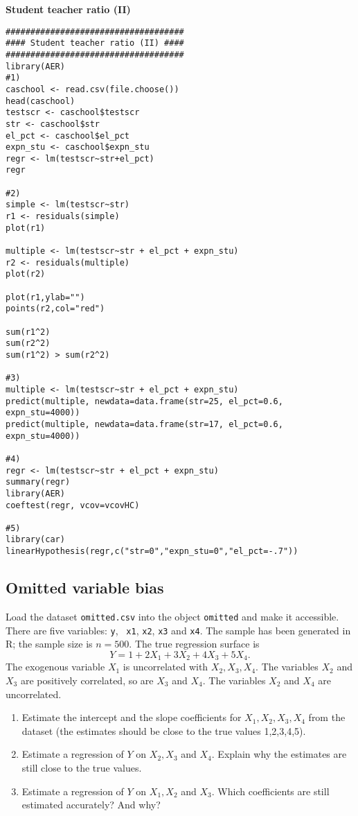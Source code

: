 \documentclass{article}
\begin{document}
\begin{solution}
\textbf{Student teacher ratio (II)}

\begin{verbatim}
####################################
#### Student teacher ratio (II) ####
####################################
library(AER)
#1)
caschool <- read.csv(file.choose())
head(caschool)
testscr <- caschool$testscr
str <- caschool$str
el_pct <- caschool$el_pct
expn_stu <- caschool$expn_stu
regr <- lm(testscr~str+el_pct)
regr

#2)
simple <- lm(testscr~str)
r1 <- residuals(simple)
plot(r1)

multiple <- lm(testscr~str + el_pct + expn_stu)
r2 <- residuals(multiple)
plot(r2)

plot(r1,ylab="")
points(r2,col="red")

sum(r1^2)
sum(r2^2)
sum(r1^2) > sum(r2^2)

#3)
multiple <- lm(testscr~str + el_pct + expn_stu)
predict(multiple, newdata=data.frame(str=25, el_pct=0.6, expn_stu=4000))
predict(multiple, newdata=data.frame(str=17, el_pct=0.6, expn_stu=4000))

#4)
regr <- lm(testscr~str + el_pct + expn_stu)
summary(regr)
library(AER)
coeftest(regr, vcov=vcovHC)

#5)
library(car)
linearHypothesis(regr,c("str=0","expn_stu=0","el_pct=-.7"))
\end{verbatim}
\end{solution}

\subsection{Omitted variable bias\label{omitted}}

Load the dataset \texttt{omitted.csv} into the object \texttt{omitted} and make it
accessible. There are five variables: \texttt{y}, \texttt{%
x1}, \texttt{x2}, \texttt{x3} and \texttt{x4}. The sample has been generated
in R; the sample size is $n=500$. The true regression surface is%
\begin{equation*}
Y=1+2X_{1}+3X_{2}+4X_{3}+5X_{4}.
\end{equation*}%
The exogenous variable $X_{1}$ is uncorrelated with $X_{2},X_{3},X_{4}$. The
variables $X_{2}$ and $X_{3}$ are positively correlated, so are $X_{3}$ and $%
X_{4}$. The variables $X_{2}$ and $X_{4}$ are uncorrelated.

\begin{enumerate}
\item Estimate the intercept and the slope coefficients for $%
X_{1},X_{2},X_{3},X_{4}$ from the dataset (the estimates should be close to
the true values 1,2,3,4,5).

\item Estimate a regression of $Y$ on $X_{2},X_{3}$ and $X_{4}$. Explain why
the estimates are still close to the true values.

\item Estimate a regression of $Y$ on $X_{1},X_{2}$ and $X_{3}$. Which
coefficients are still estimated accurately? And why?
\end{enumerate}
\end{document}
